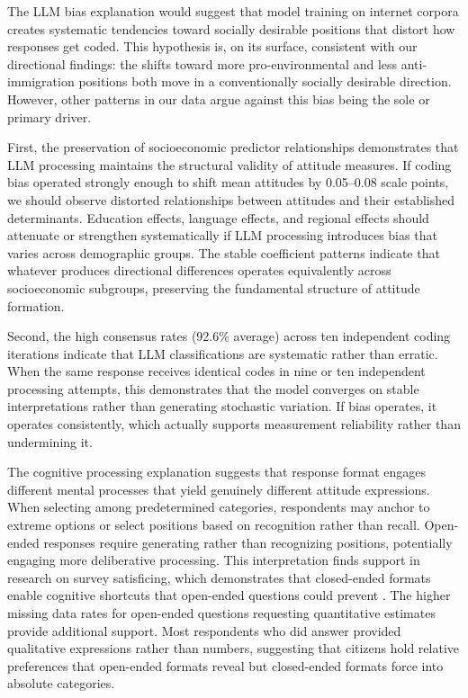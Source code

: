\documentclass[
  journal=ram,
  manuscript=article-type,
  year=2025,
  volume=unpublished,
]{cup-journal}
\begin{document}
The LLM bias explanation would suggest that model training on internet corpora creates systematic tendencies toward socially desirable positions that distort how responses get coded.
This hypothesis is, on its surface, consistent with our directional findings: the shifts toward more pro-environmental and less anti-immigration positions both move in a conventionally socially desirable direction.
However, other patterns in our data argue against this bias being the sole or primary driver.

First, the preservation of socioeconomic predictor relationships demonstrates that LLM processing maintains the structural validity of attitude measures.
If coding bias operated strongly enough to shift mean attitudes by 0.05–0.08 scale points, we should observe distorted relationships between attitudes and their established determinants.
Education effects, language effects, and regional effects should attenuate or strengthen systematically if LLM processing introduces bias that varies across demographic groups.
The stable coefficient patterns indicate that whatever produces directional differences operates equivalently across socioeconomic subgroups, preserving the fundamental structure of attitude formation.

Second, the high consensus rates (92.6\% average) across ten independent coding iterations indicate that LLM classifications are systematic rather than erratic.
When the same response receives identical codes in nine or ten independent processing attempts, this demonstrates that the model converges on stable interpretations rather than generating stochastic variation.
If bias operates, it operates consistently, which actually supports measurement reliability rather than undermining it.

The cognitive processing explanation suggests that response format engages different mental processes that yield genuinely different attitude expressions.
When selecting among predetermined categories, respondents may anchor to extreme options or select positions based on recognition rather than recall.
Open-ended responses require generating rather than recognizing positions, potentially engaging more deliberative processing.
This interpretation finds support in research on survey satisficing, which demonstrates that closed-ended formats enable cognitive shortcuts that open-ended questions could prevent \citep{krosnick91}.
The higher missing data rates for open-ended questions requesting quantitative estimates provide additional support.
Most respondents who did answer provided qualitative expressions rather than numbers, suggesting that citizens hold relative preferences that open-ended formats reveal but closed-ended formats force into absolute categories.
\end{document}
